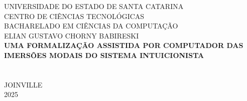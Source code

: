 \begin{titlepage}
    \begin{center}
        \textsf{UNIVERSIDADE DO ESTADO DE SANTA CATARINA} \\
        \textsf{CENTRO DE CIÊNCIAS TECNOLÓGICAS} \\
        \textsf{BACHARELADO EM CIÊNCIAS DA COMPUTAÇÃO} \\
        \vfill
        \textsf{ELIAN GUSTAVO CHORNY BABIRESKI} \\
        \vfill
        \textsf{\textbf{UMA FORMALIZAÇÃO ASSISTIDA POR COMPUTADOR DAS IMERSÕES MODAIS DO SISTEMA INTUICIONISTA}} \\
        \vfill
         \\
         \\
        \vfill
        \textsf{JOINVILLE} \\
        \textsf{2025}
    \end{center}
\end{titlepage}

